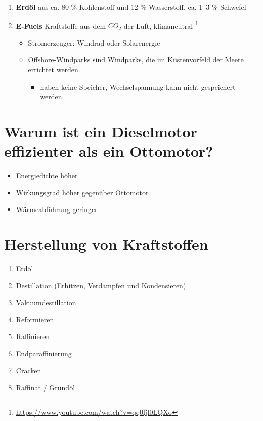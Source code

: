\begin{enumerate}
\item
  \textbf{Erdöl} aus ca. 80 \% Kohlenstoff und 12 \% Wasserstoff, ca.
  1--3 \% Schwefel
\item
  \textbf{E-Fuels} Kraftstoffe aus dem $CO_2$ der Luft, klimaneutral
  \footnote{\url{https://www.youtube.com/watch?v=qq0fjl0LQXo}}

  \begin{itemize}
  \item
    Stromerzeuger: Windrad oder Solarenergie
  \item
    Offshore-Windparks sind Windparks, die im Küstenvorfeld der Meere
    errichtet werden.

    \begin{itemize}
    \item
      haben keine Speicher, Wechselspannung kann nicht gespeichert
      werden
    \end{itemize}
  \end{itemize}
\end{enumerate}

\section{Warum ist ein Dieselmotor effizienter als ein
Ottomotor?}\label{warum-ist-ein-dieselmotor-effizienter-als-ein-ottomotor}

\begin{itemize}
\item
  Energiedichte höher
\item
  Wirkungsgrad höher gegenüber Ottomotor
\item
  Wärmeabführung geringer
\end{itemize}

\section{Herstellung von
Kraftstoffen}\label{herstellung-von-kraftstoffen}

\begin{enumerate}
\item
  Erdöl
\item
  Destillation (Erhitzen, Verdampfen und Kondensieren)
\item
  Vakuumdestillation
\item
  Reformieren
\item
  Raffinieren
\item
  Endparaffinierung\\
\item
  Cracken
\item
  Raffinat / Grundöl
\end{enumerate}

